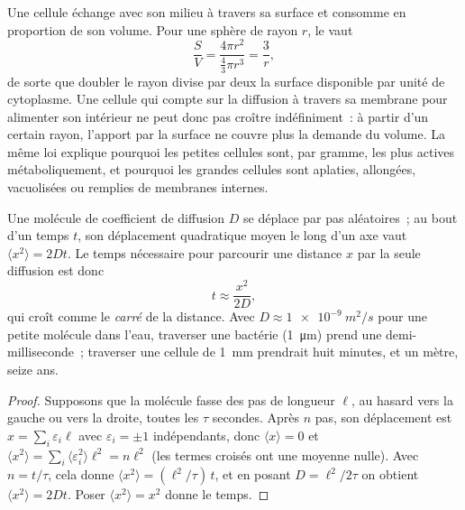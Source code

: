 \begin{proposition}\label{prop:b2:unicellular-diversity:surface}
Une cellule échange avec son milieu à travers sa surface et consomme
en proportion de son volume. Pour une sphère de rayon $r$, le
\emph{} vaut
\[
\frac{S}{V} = \frac{4\pi r^2}{\tfrac{4}{3}\pi r^3} = \frac{3}{r},
\]
de sorte que doubler le rayon divise par deux la surface disponible par
unité de cytoplasme. Une cellule qui compte sur la diffusion à travers
sa membrane pour alimenter son intérieur ne peut donc pas croître
indéfiniment~: à partir d'un certain rayon, l'apport par la surface ne
couvre plus la demande du volume. La même loi explique pourquoi les
petites cellules sont, par gramme, les plus actives métaboliquement, et
pourquoi les grandes cellules sont aplaties, allongées, vacuolisées ou
remplies de membranes internes.
\end{proposition}

\begin{theorem}\label{thm:b2:unicellular-diversity:diffusion}
Une molécule de coefficient de diffusion $D$ se déplace par pas
aléatoires~; au bout d'un temps $t$, son déplacement quadratique moyen
le long d'un axe vaut $\langle x^2\rangle = 2Dt$. Le temps nécessaire
pour parcourir une distance $x$ par la seule diffusion est donc
\[
t \approx \frac{x^2}{2D},
\]
qui croît comme le \emph{carré} de la distance. Avec
$D \approx \qty{1e-9}{m^2/s}$ pour une petite molécule dans l'eau,
traverser une bactérie (\qty{1}{\micro m}) prend une demi-milliseconde~;
traverser une cellule de \qty{1}{mm} prendrait huit minutes, et un
mètre, seize ans.
\end{theorem}
\begin{proof}
Supposons que la molécule fasse des pas de longueur $\ell$, au hasard
vers la gauche ou vers la droite, toutes les $\tau$ secondes. Après $n$
pas, son déplacement est $x = \sum_i \varepsilon_i \ell$ avec
$\varepsilon_i = \pm 1$ indépendants, donc $\langle x\rangle = 0$ et
$\langle x^2\rangle =
\sum_i \langle\varepsilon_i^2\rangle \ell^2 = n\ell^2$ (les termes
croisés ont une moyenne nulle). Avec $n = t/\tau$, cela donne
$\langle x^2\rangle
= (\ell^2/\tau)\,t$, et en posant $D = \ell^2/2\tau$ on obtient
$\langle x^2\rangle = 2Dt$. Poser $\langle x^2\rangle = x^2$ donne le
temps.
\end{proof}

